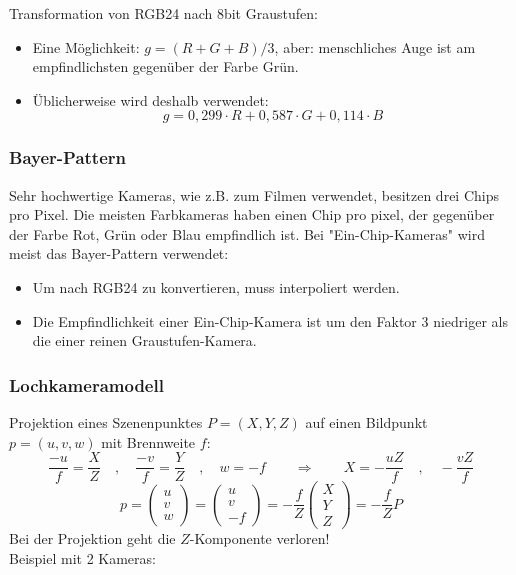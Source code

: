 Transformation von RGB24 nach 8bit Graustufen:
\begin{itemize}
\item Eine Möglichkeit: $g = (R+G+B)/3$, aber: menschliches Auge ist am empfindlichsten gegenüber der Farbe Grün.
\item Üblicherweise wird deshalb verwendet: $$g = 0,299 \cdot R + 0,587 \cdot G + 0,114 \cdot B$$
\end{itemize}

\subsubsection*{Bayer-Pattern}

Sehr hochwertige Kameras, wie z.B. zum Filmen verwendet, besitzen drei Chips pro Pixel. Die meisten Farbkameras haben einen Chip pro pixel, der gegenüber der Farbe Rot, Grün oder Blau empfindlich ist. Bei "{}Ein-Chip-Kameras"{} wird meist das Bayer-Pattern verwendet:
\begin{itemize}
\item Um nach RGB24 zu konvertieren, muss interpoliert werden.
\item Die Empfindlichkeit einer Ein-Chip-Kamera ist um den Faktor 3 niedriger als die einer reinen Graustufen-Kamera.
\end{itemize}

\subsubsection*{Lochkameramodell}


Projektion eines Szenenpunktes $P = (X,Y,Z)$ auf einen Bildpunkt $p = (u,v,w)$ mit Brennweite $f$:
$$\frac{-u}{f} = \frac{X}{Z} \quad , \quad \frac{-v}{f} = \frac{Y}{Z} \quad , \quad w = -f \qquad \Rightarrow \qquad X = - \frac{uZ}{f} \quad , \quad - \frac{vZ}{f}$$
$$p = \left( \begin{array}{c} u \\ v \\ w \end{array} \right) = \left( \begin{array}{c} u \\ v \\ -f \end{array} \right) = - \frac{f}{Z} \left( \begin{array}{c} X \\ Y \\ Z \end{array} \right) = - \frac{f}{Z} P$$
Bei der Projektion geht die $Z$-Komponente verloren! \\
Beispiel mit 2 Kameras:

